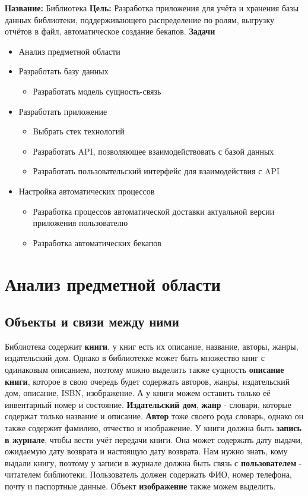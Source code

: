 \documentclass[a4paper,14pt]{extarticle}
\begin{document}
\textbf{Название: }Библиотека\bigbreak
\textbf{Цель: }Разработка приложения для учёта и хранения базы данных библиотеки, 
поддерживающего распределение по ролям, выгрузку отчётов в файл, автоматическое
создание бекапов.\bigbreak
\textbf{Задачи}
\begin{itemize}
    \item Анализ предметной области
    \item Разработать базу данных
    \begin{itemize}
      \item Разработать модель сущность-связь
    \end{itemize}
    \item Разработать приложение
    \begin{itemize}
      \item Выбрать стек технологий
      \item Разработать API, позволяющее взаимодействовать с базой данных
      \item Разработать пользовательский интерфейс для взаимодействия с API
    \end{itemize}
    \item Настройка автоматических процессов
    \begin{itemize}
      \item Разработка процессов автоматической доставки актуальной версии приложения пользователю
      \item Разработка автоматических бекапов
    \end{itemize}
\end{itemize}

\section{Анализ предметной области}

\subsection{Объекты и связи между ними}
Библиотека содержит \textbf{книги}, у книг есть 
их описание, название, авторы, жанры, издательский дом. Однако
в библиотекке может быть множество книг с одинаковым описанием, 
поэтому можно выделить также сущность \textbf{описание книги}, 
которое в свою очередь будет содержать авторов, жанры, издательский дом, 
описание, ISBN, изображение. А у книги можем оставить только её
инвентарный номер и состояние. \textbf{Издательский дом}, \textbf{жанр} - 
словари, которые содержат только название и описание. \textbf{Автор} тоже
своего рода словарь, однако он также содержит фамилию, отчество и изображение.
У книги должна быть \textbf{запись в журнале}, чтобы вести учёт передачи книги. 
Она может содержать дату выдачи, ожидаемую дату возврата и настоящую дату возврата.
Нам нужно знать, кому выдали книгу, поэтому у записи в журнале должна быть связь с
\textbf{пользователем} - читателем библиотеки. Пользователь должен содержать ФИО, 
номер телефона, почту и паспортные данные. Объект \textbf{изображение} также можем 
выделить.
\end{document}
